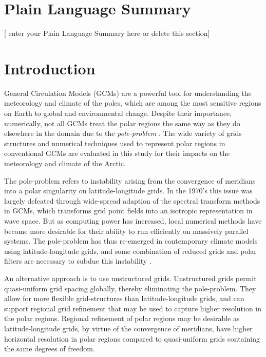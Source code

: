 \documentclass[draft]{agujournal2019}
\begin{document}
\section*{Plain Language Summary}
[ enter your Plain Language Summary here or delete this section]


%
%

\section{Introduction}

General Circulation Models (GCMs) are a powerful tool for understanding the meteorology and climate of the poles, which are among the most sensitive regions on Earth to global and environmental change. Despite their importance, numerically, not all GCMs treat the polar regions the same way as they do elsewhere in the domain due to the \textit{pole-problem} \cite{W2007JMSJ}. The wide variety of grids structures and numerical techniques used to represent polar regions in conventional GCMs are evaluated in this study for their impacts on the meteorology and climate of the Arctic.

The pole-problem refers to instability arising from the convergence of meridians into a polar singularity on latitude-longitude grids. In the 1970's this issue was largely defeated through wide-spread adaption of the spectral transform methods in GCMs, which transforms grid point fields into an isotropic representation in wave space. But as computing power has increased, local numerical methods have become more desirable for their ability to run efficiently on massively parallel systems. The pole-problem has thus re-emerged in contemporary climate models using latitude-longitude grids, and some combination of reduced grids and polar filters are necessary to subdue this instability \cite{JW2010LNCSE}. 

An alternative approach is to use unstructured grids. Unstructured grids permit quasi-uniform grid spacing globally, thereby eliminating the pole-problem. They allow for more flexible grid-structures than latitude-longitude grids, and can support regional grid refinement that may be used to capture higher resolution in the polar regions. Regional refinement of polar regions may be desirable as latitude-longitude grids, by virtue of the convergence of meridians, have higher horizontal resolution in polar regions compared to quasi-uniform grids containing the same degrees of freedom.
\end{document}
